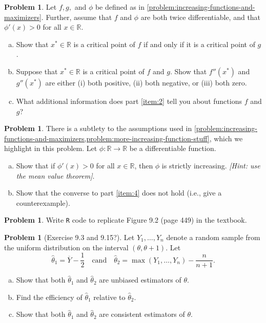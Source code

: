 \documentclass[10pt]{article}
\theoremstyle{definition}
\newtheorem{problem}[theorem]{Problem}
\newcommand{\1}[1]{\textbf{1}_{\left[#1\right]}} %
\def\R{\mathbb{R}} %
\begin{document}
\begin{problem}
  \label{problem:more-increasing-function-stuff}
  Let $f,g,$ and $\phi$ be defined as in
  \cref{problem:increasing-functions-and-maximizers}. Further, assume that $f$
  and $\phi$ are both twice differentiable, and that $\phi'(x)>0$ for all
  $x\in \R$.
  \begin{enumerate}[(a)]
    \item \label{item:1} Show that $x^{*}\in \R$ is a critical point of $f$ if
    and only if it is a critical point of $g$.
    \item \label{item:2} Suppose that $x^{*}\in \R$ is a critical point of $f$
    and $g$. Show that $f''(x^{*})$ and $g''(x^{*})$ are either (i) both
    positive, (ii) both negative, or (iii) both zero.
    \item What additional information does part \ref{item:2} tell you about
    functions $f$ and $g$?
  \end{enumerate}
\end{problem}

\begin{problem}
  There is a subtlety to the assumptions used in
  \cref{problem:increasing-functions-and-maximizers,problem:more-increasing-function-stuff},
  which we highlight in this problem. Let $\phi:\R \to \R$ be a differentiable
  function.
  \begin{enumerate}[(a)]
    \item \label{item:4} Show that if $\phi'(x)>0$ for all $x\in \R$, then
    $\phi$ is strictly increasing. \textit{[Hint: use the mean value
      theorem]}.
    \item Show that the converse to part \ref{item:4} does not hold (i.e.,
    give a counterexample).
  \end{enumerate}
\end{problem}

\newpage
\begin{problem}
  Write \texttt{R} code to replicate Figure 9.2 (page 449) in the textbook.
\end{problem}

\begin{problem}[Exercise 9.3 and 9.15?]
  Let $Y_{1},\ldots,Y_{n}$ denote a random sample from the uniform
  distribution on the interval $(\theta,\theta+1)$. Let
  \begin{equation*}
    \widehat{\theta}_{1} 
    = \overline{Y}-\frac{1}{2} \quad \text{cand} \quad \widehat{\theta}_{2} 
    = \max(Y_{1},\ldots,Y_{n}) - \frac{n}{n+1}.
  \end{equation*}
  \begin{enumerate}[(a)]
    \item Show that both $\widehat{\theta}_{1}$ and $\widehat{\theta}_{2}$ are
    unbiased estimators of $\theta$.  
    \item Find the efficiency of $\hat{\theta}_{1}$ relative to
    $\widehat{\theta}_{2}$.
    \item Show that both $\hat{\theta}_{1}$ and $\widehat{\theta}_{2}$ are
    consistent estimators of $\theta$.   
  \end{enumerate}
\end{problem}
\end{document}
